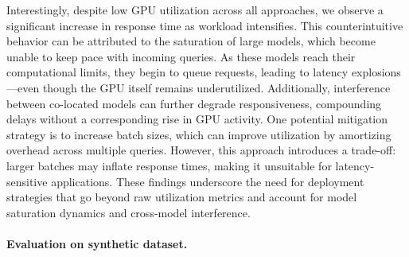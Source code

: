 Interestingly, despite low GPU utilization across all approaches, we observe a significant increase in response time as workload intensifies. This counterintuitive behavior can be attributed to the saturation of large models, which become unable to keep pace with incoming queries. As these models reach their computational limits, they begin to queue requests, leading to latency explosions—even though the GPU itself remains underutilized. Additionally, interference between co-located models can further degrade responsiveness, compounding delays without a corresponding rise in GPU activity. One potential mitigation strategy is to increase batch sizes, which can improve utilization by amortizing overhead across multiple queries. However, this approach introduces a trade-off: larger batches may inflate response times, making it unsuitable for latency-sensitive applications. These findings underscore the need for deployment strategies that go beyond raw utilization metrics and account for model saturation dynamics and cross-model interference.


\paragraph{Evaluation on synthetic dataset.}

